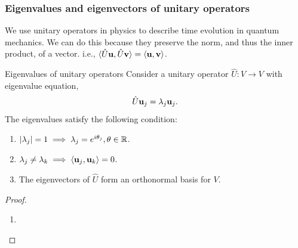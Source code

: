 \documentclass{book}
\def\innerproduct#1#2{\langle#1,#2\rangle}
\begin{document}
\subsubsection{Eigenvalues and eigenvectors of unitary operators}
We use unitary operators in physics to describe time evolution in quantum mechanics. We can do this because they preserve the norm, and thus the inner product, of a vector. i.e., $\innerproduct{\hat{U}\vb{u}}{\hat{U}\vb{v}} = \innerproduct{\vb{u}}{\vb{v}}$.
\begin{Theorems}{Eigenvalues of unitary operators}{}
	Consider a unitary operator $\hat{U} : V \to V$ with eigenvalue equation,
	\begin{equation}
		\hat{U}\vb{u}_j = \lambda_j\vb{u}_j.
	\end{equation}
	The eigenvalues satisfy the following condition:
	\begin{enumerate}
		\item $\abs{\lambda_j} = 1 \implies \lambda_j = e^{i\theta_j}, \theta \in \mathbb{R}$.
		\item $\lambda_j \neq \lambda_k \implies \innerproduct{\vb{u}_j}{\vb{u}_k} = 0$.
		\item The eigenvectors of $\hat{U}$ form an orthonormal basis for $V$.
	\end{enumerate}
\end{Theorems}
\begin{proof}
	\begin{enumerate}
		\item 
	\end{enumerate}
\end{proof}
\end{document}
